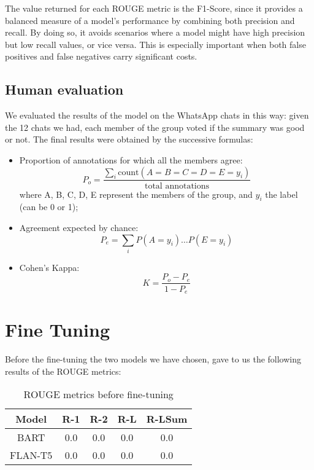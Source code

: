 \documentclass[10pt,twocolumn,letterpaper]{article}
\begin{document}
The value returned for each ROUGE metric is the F1-Score, since it provides a balanced measure of a model's performance by combining both precision and recall. By doing so, it avoids scenarios where a model might have high precision but low recall values, or vice versa. This is especially important when both false positives and false negatives carry significant costs.

\subsection{Human evaluation}
We evaluated the results of the model on the WhatsApp chats in this way: given the 12 chats we had, each member of the group voted if the summary was good or not.
The final results were obtained by the successive formulas:
\begin{itemize}
    \item Proportion of annotations for which all the members agree:
    \begin{equation}
        P_o = \frac{\sum_i \text{count}(A=B=C=D=E=y_i)}{\text{total annotations}}
    \end{equation}
    where A, B, C, D, E represent the members of the group, and $y_i$ the label (can be 0 or 1);
    \item Agreement expected by chance:
    \begin{equation}
        P_e = \sum_i P(A=y_i) \ldots P(E=y_i)
    \end{equation}
    \item Cohen's Kappa:
    \begin{equation}
        K = \frac{P_o - P_e}{1 - P_e}
    \end{equation}
\end{itemize}

\section{Fine Tuning}
Before the fine-tuning the two models we have chosen, gave to us the following results of the ROUGE metrics:
\begin{table}[h!]
    \centering
    \begin{tabular}{|c|c|c|c|c|}
        \hline
        Model & R-1 & R-2 & R-L & R-LSum \\ 
        \hline
        BART & 0.0 & 0.0 & 0.0 & 0.0\\
        FLAN-T5 & 0.0 & 0.0 & 0.0 & 0.0\\
        \hline
    \end{tabular}
    \caption{ROUGE metrics before fine-tuning}
    \label{table:ROUGEbeforeft}
\end{table}
\end{document}
